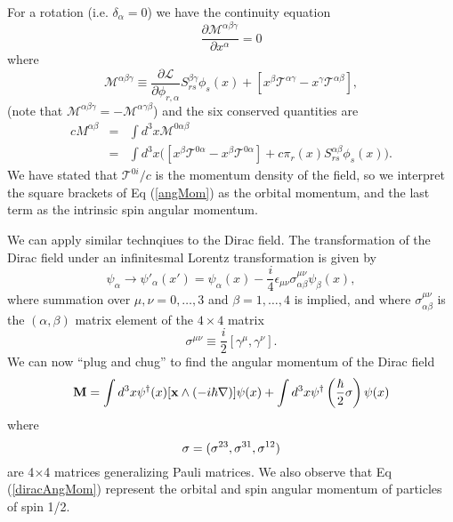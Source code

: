 For a rotation (i.e. $\delta_\alpha=0$) we have the continuity equation
\begin{equation}
\frac{\partial\mathcal{M}^{\alpha\beta\gamma}}{\partial x^{\alpha}} = 0
\end{equation}
where
\begin{equation}
\mathcal{M}^{\alpha\beta\gamma}\equiv\frac{\partial\mathcal{L}}{\partial\phi_{r,\alpha}}S^{\beta\gamma}_{rs}\phi_{s}(x) + [x^{\beta}\mathcal{T}^{\alpha\gamma} - x^{\gamma}\mathcal{T}^{\alpha\beta}],
\end{equation}
(note that $\mathcal{M}^{\alpha\beta\gamma}=-\mathcal{M}^{\alpha\gamma\beta}$) and the six conserved quantities are
\begin{eqnarray}
cM^{\alpha\beta} &=& \int d^3x \mathcal{M}^{0\alpha\beta} \nonumber\\
&=& \int d^3x \Big( [x^{\beta}\mathcal{T}^{0\alpha} - x^{\beta}\mathcal{T}^{0\alpha}] + c\pi_r(x)S^{\alpha\beta}_{rs}\phi_{s}(x) \Big).\label{angMom}
\end{eqnarray}
We have stated that $\mathcal{T}^{0i}/c$ is the momentum density of the field, so we interpret the square brackets of Eq (\ref{angMom}) as the orbital momentum, and the last term as the intrinsic spin angular momentum.

We can apply similar technqiues to the Dirac field. The transformation of the Dirac field under an infinitesmal Lorentz transformation is given by
\begin{equation}
\psi_{\alpha}\to\psi'_{\alpha}(x') = \psi_{\alpha}(x) - \frac{i}{4}\epsilon_{\mu\nu}\sigma^{\mu\nu}_{\alpha\beta}\psi_{\beta}(x),
\end{equation}
where summation over $\mu,\nu=0,\ldots,3$ and $\beta=1,\ldots,4$ is implied, and where $\sigma^{\mu\nu}_{\alpha\beta}$ is the $(\alpha,\beta)$ matrix element of the $4\times 4$ matrix
\begin{equation}
\sigma^{\mu\nu}\equiv\frac{i}{2}[\gamma^{\mu},\gamma^{\nu}].
\end{equation}
 We can now ``plug and chug'' to find the angular momentum of the Dirac field
\begin{equation}\label{diracAngMom}
\bold{M} = \int d^{3}x \psi^{\dag}(x)[\bold{x}\wedge(-i\hbar\nabla)]\psi(x) + \int d^{3}x\psi^{\dag}\left(\frac{\hbar}{2}\bold{\sigma}\right)\psi(x)
\end{equation}
where
\begin{equation}
\bold{\sigma} = (\sigma^{23},\sigma^{31},\sigma^{12})
\end{equation}
are 4$\times$4 matrices generalizing Pauli matrices. We also observe that Eq (\ref{diracAngMom}) represent the orbital and spin angular momentum of particles of spin 1/2.



